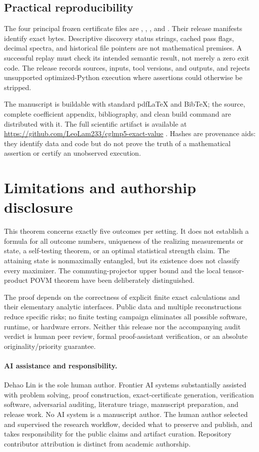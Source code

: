 \documentclass[11pt,a4paper]{article}
\numberwithin{equation}{section}
\theoremstyle{remark}\newtheorem{remark}[theorem]{Remark}
\begin{document}
\subsection{Practical reproducibility}
The four principal frozen certificate files are
, ,
, and .
Their release manifests identify exact bytes. Descriptive discovery status
strings, cached pass flags, decimal spectra, and historical file pointers are
not mathematical premises. A successful replay must check its intended
semantic result, not merely a zero exit code. The release records sources,
inputs, tool versions, and outputs, and rejects unsupported optimized-Python
execution where assertions could otherwise be stripped.

The manuscript is buildable with standard pdfLaTeX and BibTeX; the source,
complete coefficient appendix, bibliography, and clean build command are
distributed with it. The full scientific artifact is available at
\url{https://github.com/LeoLam233/cglmp5-exact-value} \cite{Artifact}.
Hashes are provenance aids: they identify data and code but do not prove
the truth of a mathematical assertion or certify an unobserved execution.

\section{Limitations and authorship disclosure}\label{sec:limits}
This theorem concerns exactly five outcomes per setting. It does not
establish a formula for all outcome numbers, uniqueness of the realizing
measurements or state, a self-testing theorem, or an optimal statistical
strength claim. The attaining state is nonmaximally entangled, but its
existence does not classify every maximizer. The commuting-projector upper
bound and the local tensor-product POVM theorem have been deliberately
distinguished.

The proof depends on the correctness of explicit finite exact calculations
and their elementary analytic interfaces. Public data and multiple
reconstructions reduce specific risks; no finite testing campaign eliminates
all possible software, runtime, or hardware errors. Neither this release nor
the accompanying audit verdict is human peer review, formal proof-assistant
verification, or an absolute originality/priority guarantee.

\paragraph{AI assistance and responsibility.}
Dehao Lin is the sole human author. Frontier AI systems substantially assisted
with problem solving, proof construction, exact-certificate generation,
verification software, adversarial auditing, literature triage, manuscript
preparation, and release work. No AI system is a manuscript author. The human
author selected and supervised the research workflow, decided what to
preserve and publish, and takes responsibility for the public claims and
artifact curation. Repository contributor attribution is distinct from
academic authorship.
\end{document}
